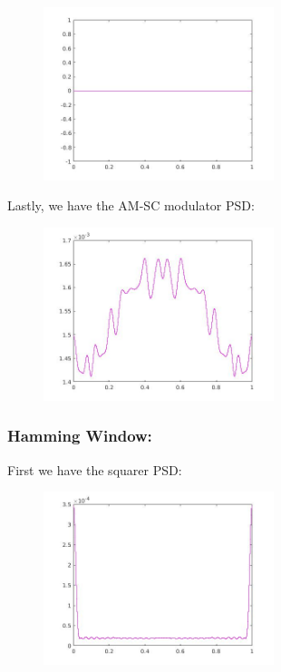 \documentclass[a4paper,11pt]{article}
\begin{document}
\begin{figure}[!hp]
    \begin{center}
    \includegraphics[width=0.6\textwidth]{images/lab3_34.jpg}
    \end{center}
\end{figure}

Lastly, we have the AM-SC modulator PSD:

\begin{figure}[!hp]
    \begin{center}
    \includegraphics[width=0.6\textwidth]{images/lab3_44.jpg}
    \end{center}
\end{figure}

\newpage

\subsubsection{Hamming Window:}

First we have the squarer PSD:
\begin{figure}[!hp]
    \begin{center}
    \includegraphics[width=0.6\textwidth]{images/lab3_26.jpg}
    \end{center}
\end{figure}
\end{document}
